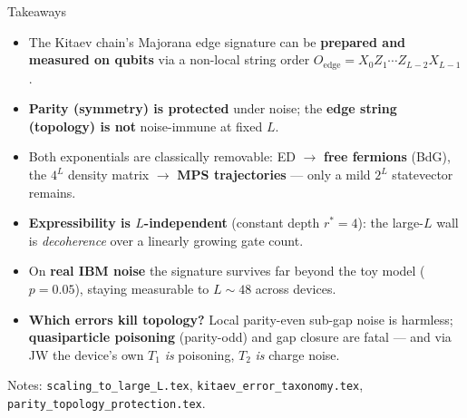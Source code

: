 \documentclass[aspectratio=169,12pt]{beamer}
\newcommand{\Oedge}{X_0Z_1\cdots Z_{L-2}X_{L-1}}
\begin{document}
\begin{frame}{Takeaways}
  \begin{itemize}
    \item The Kitaev chain's Majorana edge signature can be \textbf{prepared and measured on qubits} via a non-local string order $O_{\mathrm{edge}}=\Oedge$.
    \item \textbf{Parity (symmetry) is protected} under noise; the \textbf{edge string (topology) is not} noise-immune at fixed $L$.
    \item Both exponentials are classically removable: ED $\to$ \textbf{free fermions} (BdG), the $4^L$ density matrix $\to$ \textbf{MPS trajectories} --- only a mild $2^L$ statevector remains.
    \item \textbf{Expressibility is $L$-independent} (constant depth $r^\ast=4$): the large-$L$ wall is \emph{decoherence} over a linearly growing gate count.
    \item On \textbf{real IBM noise} the signature survives far beyond the toy model ($p=0.05$), staying measurable to $L\!\sim\!48$ across devices.
    \item \textbf{Which errors kill topology?} Local parity-even sub-gap noise is harmless; \textbf{quasiparticle poisoning} (parity-odd) and gap closure are fatal --- and via JW the device's own $T_1$ \emph{is} poisoning, $T_2$ \emph{is} charge noise.
  \end{itemize}
  \vfill
  \centering
  \footnotesize Notes: \texttt{scaling\_to\_large\_L.tex}, \texttt{kitaev\_error\_taxonomy.tex}, \texttt{parity\_topology\_protection.tex}.
\end{frame}
\end{document}
